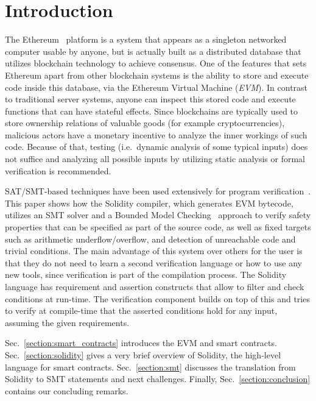 \section{Introduction}
The Ethereum~\cite{WhitePaper} platform is a system that appears as a
singleton networked computer usable by anyone, but is actually built as a
distributed database that utilizes blockchain technology to achieve consensus.
%
One of the features that sets Ethereum apart from other blockchain systems is
the ability to store and execute code inside this database, via the Ethereum
Virtual Machine (\emph{EVM}).
%
In contrast to traditional server systems, anyone can inspect this stored code
and execute functions that can have stateful effects.
%
Since blockchains are typically used to store ownership relations of valuable goods
(for example
cryptocurrencies),
malicious actors have a monetary incentive to analyze the inner
workings of such code. Because of that, testing (i.e.\  dynamic analysis of some
typical inputs) does not suffice and analyzing all possible inputs by utilizing
static analysis or formal verification is recommended.

SAT/SMT-based techniques have been used extensively for program 
verification~\cite{Biere99,Donaldson11,Komuravelli13,Beyer11,Kroening14,Alt17}.
%
This paper shows how the Solidity compiler, which generates EVM bytecode,
utilizes an SMT solver and a Bounded Model Checking~\cite{Biere99} approach to
verify safety properties that can be specified as part of the source code, as
well as fixed targets such as arithmetic underflow/overflow, and detection of
unreachable code and trivial conditions.
%
The main advantage of this system over others for the user is that they do not
need to learn a second verification language or how to use any new tools, since
verification is part of the compilation process.
%
The Solidity language has requirement and assertion constructs that allow to
filter and check conditions at run-time.  The verification component
builds on top of this and tries to
verify at compile-time that the asserted conditions hold for any input,
assuming the given requirements.

Sec.~\ref{section:smart_contracts} introduces the EVM and smart contracts.
Sec.~\ref{section:solidity} gives a very brief overview of Solidity,
the high-level language for smart
contracts. Sec.~\ref{section:smt} discusses the translation from Solidity to SMT
statements and next challenges. Finally, Sec.~\ref{section:conclusion}
contains our concluding remarks.

